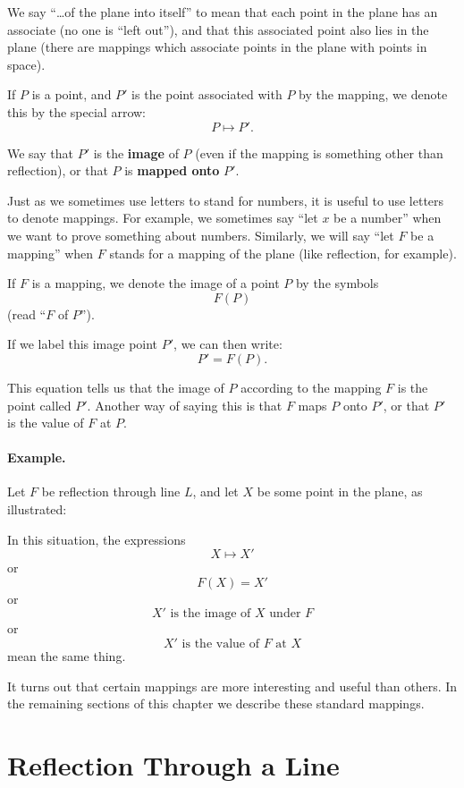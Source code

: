 \documentclass[12pt]{book} %
\begin{document}
\begin{ExerciseList}
We say ``\ldots of the plane into itself'' to mean that each point in the plane has an associate (no one is ``left out''), and that this associated point also lies in the plane (there are mappings which associate points in the plane with points in space).

If $P$ is a point, and $P'$ is the point associated with $P$ by the mapping, we denote this by the special arrow:
\[
P \longmapsto P'.
\]

We say that $P'$ is the \textbf{image} of $P$ (even if the mapping is something other than reflection), or that $P$ is \textbf{mapped onto} $P'$.

Just as we sometimes use letters to stand for numbers, it is useful to use letters to denote mappings. For example, we sometimes say ``let $x$ be a number'' when we want to prove something about numbers. Similarly, we will say ``let $F$ be a mapping'' when $F$ stands for a mapping of the plane (like reflection, for example).

If $F$ is a mapping, we denote the image of a point $P$ by the symbols
\[
F(P)
\]
(read ``$F$ of $P$'').

If we label this image point $P'$, we can then write:
\[
P'=F(P).
\]

This equation tells us that the image of $P$ according to the mapping $F$ is the point called $P'$. Another way of saying this is that $F$ maps $P$ onto $P'$, or that $P'$ is the value of $F$ at $P$.

\paragraph{Example.}
Let $F$ be reflection through line $L$, and let $X$ be some point in the plane, as illustrated:


In this situation, the expressions
\[
X \longmapsto X'
\]
or
\[
F(X)=X'
\]
or
\[
X' \text{ is the image of } X \text{ under } F
\]
or
\[
X' \text{ is the value of } F \text{ at } X
\]
mean the same thing.

It turns out that certain mappings are more interesting and useful than others. In the remaining sections of this chapter we describe these standard mappings.

\section{Reflection Through a Line}


\end{ExerciseList}
\end{document}
